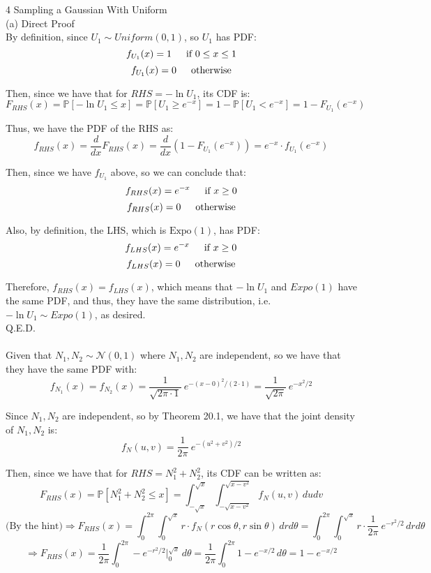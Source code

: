 \documentclass{article}
\begin{document}
{\Large 4 Sampling a Gaussian With Uniform} \\[.5cm]
{\color{red} (a) Direct Proof } \\

By definition, since $U_1\sim Uniform(0,1)$, so $U_1$ has PDF:
$$f_{U_1}(x) = 1 \indent \text{if } 0\leq x\leq 1$$
$$f_{U_1}(x) = 0 \indent \text{otherwise}$$

Then, since we have that for $RHS = -\ln U_1$, its CDF is:
$$F_{RHS}(x) =
\mathbb{P}[-\ln U_1\leq x] =
\mathbb{P}[U_1 \geq e^{-x}] =
1 - \mathbb{P}[U_1 < e^{-x}] =
1 - F_{U_1}(e^{-x}) $$

Thus, we have the PDF of the RHS as:
$$f_{RHS}(x) = \frac{d}{dx} F_{RHS}(x) =
\frac{d}{dx} (1 - F_{U_1}(e^{-x})) =
e^{-x}\cdot f_{U_1}(e^{-x}) $$

Then, since we have $f_{U_1}$ above, so we can conclude that:
$$f_{RHS}(x) = e^{-x}\indent \text{if } x\geq0$$
$$f_{RHS}(x) = 0 \indent \text{otherwise}$$

Also, by definition, the LHS, which is $\text{Expo}(1)$, has PDF:
$$f_{LHS}(x) = e^{-x}\indent \text{if } x\geq0$$
$$f_{LHS}(x) = 0 \indent \text{otherwise}$$

Therefore, $f_{RHS}(x) = f_{LHS}(x)$, which means that $-\ln U_1$ and $Expo(1)$ have the same PDF, and thus, they have the same distribution, i.e. $-\ln U_1 \sim Expo(1)$, as desired. \\

Q.E.D. \\



 \\

Given that $N_1, N_2\sim\mathscr{N}(0,1)$ where $N_1,N_2$ are independent, so we have that they have the same PDF with:
$$f_{N_1}(x) = f_{N_2}(x) =
\frac{1}{\sqrt{2\pi\cdot1}}\ e^{-(x-0)^2 / (2\cdot1)} =
\frac{1}{\sqrt{2\pi}}\ e^{-x^2 / 2} $$

Since $N_1,N_2$ are independent, so by Theorem 20.1, we have that the joint density of $N_1, N_2$ is:
$$f_{N}(u, v) = \frac{1}{2\pi}\ e^{-(u^2+v^2)/2}$$

Then, since we have that for $RHS = N_1^2 + N_2^2$, its CDF can be written as:
$$F_{RHS}(x) =
\mathbb{P}[N_1^2 + N_2^2 \leq x] =
\int_{-\sqrt{x}}^{\sqrt{x}}
	\int_{-\sqrt{x-v^2}}^{\sqrt{x-v^2}}
		f_{N}(u,v)\, dudv $$
$$\text{(By the hint)} \Longrightarrow F_{RHS}(x) =
\int_{0}^{2\pi} \int_{0}^{\sqrt{x}}
	r\cdot f_{N}(r\cos\theta, r\sin\theta)\, drd\theta =
\int_{0}^{2\pi} \int_{0}^{\sqrt{x}}
	r\cdot \frac{1}{2\pi}\ e^{-r^2/2} \, drd\theta $$
$$\Longrightarrow F_{RHS}(x) =
\frac{1}{2\pi}\int_{0}^{2\pi} -e^{-r^2/2}\Big|_{0}^{\sqrt{x}} \, d\theta =
\frac{1}{2\pi}\int_{0}^{2\pi} 1 - e^{-x/2} \, d\theta =
1 - e^{-x/2} $$
\end{document}
